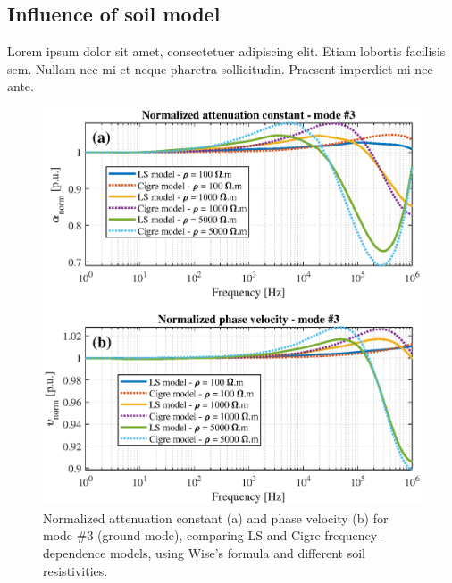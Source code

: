 \documentclass[lettersize,journal]{IEEEtran}
\newcommand*{\shortblindtext}{Lorem ipsum dolor sit amet, consectetuer adipiscing elit. Etiam lobortis facilisis sem. Nullam nec mi et neque pharetra sollicitudin. Praesent imperdiet mi nec ante.}
\begin{document}
\subsection{Influence of soil model}
\shortblindtext
\begin{figure}[tbh]
	\centering
	\label{fig:WiSoilModel_ratio_mode3}
	\includegraphics[width=1\columnwidth]{./fig/WiSoilModel_ratio_mode3.eps}
	\caption{Normalized attenuation constant (a) and phase velocity (b) for mode \#3 (ground mode), comparing LS and Cigre frequency-dependence models, using Wise's formula and different soil resistivities.}
\end{figure}
\end{document}
